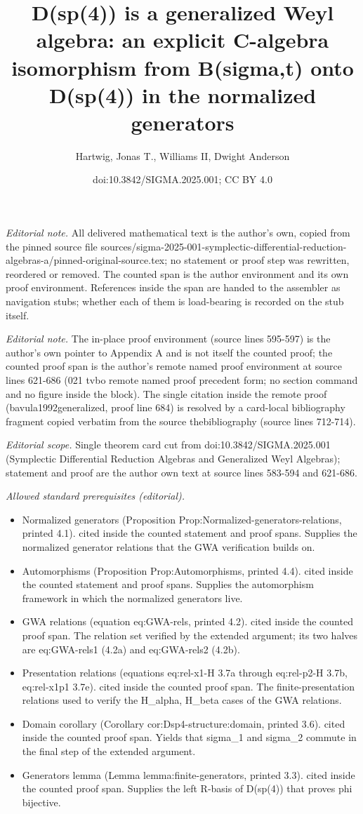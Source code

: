 \documentclass[10pt,a4paper]{article}
\title{D(sp(4)) is a generalized Weyl algebra: an explicit C-algebra isomorphism from B(sigma,t) onto D(sp(4)) in the normalized generators}
\author{Hartwig, Jonas T., Williams II, Dwight Anderson}
\date{doi:10.3842/SIGMA.2025.001; CC BY 4.0}
\numberwithin{equation}{section}
\begin{document}
\maketitle
\setcounter{section}{4}
\setcounter{Theorem}{5}
\noindent\textit{Editorial note.} All delivered mathematical text is the author's own, copied from the pinned source file sources/sigma-2025-001-symplectic-differential-reduction-algebras-a/pinned-original-source.tex; no statement or proof step was rewritten, reordered or removed. The counted span is the author environment and its own proof environment. References inside the span are handed to the assembler as navigation stubs; whether each of them is load-bearing is recorded on the stub itself.\par\medskip
\noindent\textit{Editorial note.} The in-place proof environment (source lines 595-597) is the author's own pointer to Appendix A and is not itself the counted proof; the counted proof span is the author's remote named proof environment at source lines 621-686 (021 tvbo remote named proof precedent form; no section command and no figure inside the block). The single citation inside the remote proof (bavula1992generalized, proof line 684) is resolved by a card-local bibliography fragment copied verbatim from the source thebibliography (source lines 712-714).\par\medskip
\noindent\textit{Editorial scope.} Single theorem card cut from doi:10.3842/SIGMA.2025.001 (Symplectic Differential Reduction Algebras and Generalized Weyl Algebras); statement and proof are the author own text at source lines 583-594 and 621-686.\par\medskip
\noindent\textit{Allowed standard prerequisites (editorial).}\begin{itemize}
\item Normalized generators (Proposition Prop:Normalized-generators-relations, printed 4.1). cited inside the counted statement and proof spans. Supplies the normalized generator relations that the GWA verification builds on.
\item Automorphisms (Proposition Prop:Automorphisms, printed 4.4). cited inside the counted statement and proof spans. Supplies the automorphism framework in which the normalized generators live.
\item GWA relations (equation eq:GWA-rels, printed 4.2). cited inside the counted proof span. The relation set verified by the extended argument; its two halves are eq:GWA-rels1 (4.2a) and eq:GWA-rels2 (4.2b).
\item Presentation relations (equations eq:rel-x1-H 3.7a through eq:rel-p2-H 3.7b, eq:rel-x1p1 3.7e). cited inside the counted proof span. The finite-presentation relations used to verify the H\_alpha, H\_beta cases of the GWA relations.
\item Domain corollary (Corollary cor:Dsp4-structure:domain, printed 3.6). cited inside the counted proof span. Yields that sigma\_1 and sigma\_2 commute in the final step of the extended argument.
\item Generators lemma (Lemma lemma:finite-generators, printed 3.3). cited inside the counted proof span. Supplies the left R-basis of D(sp(4)) that proves phi bijective.
\end{itemize}\medskip
\end{document}
